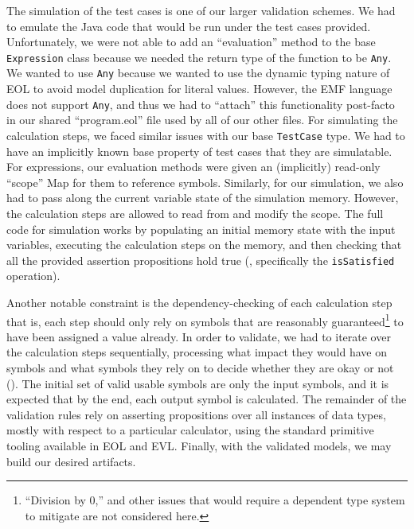 \documentclass[11pt,fleqn]{article}
\begin{document}
The simulation of the test cases is one of our larger validation schemes. We had
to emulate the Java code that would be run under the test cases provided.
Unfortunately, we were not able to add an ``evaluation'' method to the base
\lstinline{Expression} class because we needed the return type of the function
to be \lstinline{Any}. We wanted to use \lstinline{Any} because we wanted to use
the dynamic typing nature of EOL to avoid model duplication for literal values.
However, the EMF language does not support \lstinline{Any}, and thus we had to
``attach'' this functionality post-facto in our shared ``program.eol'' file used
by all of our other files. For simulating the calculation steps, we faced
similar issues with our base \lstinline{TestCase} type. We had to have an
implicitly known base property of test cases that they are simulatable. For
expressions, our evaluation methods were given an (implicitly) read-only
``scope'' Map for them to reference symbols. Similarly, for our simulation, we
also had to pass along the current variable state of the simulation memory.
However, the calculation steps are allowed to read from and modify the scope.
The full code for simulation works by populating an initial memory state with
the input variables, executing the calculation steps on the memory, and then
checking that all the provided assertion propositions hold true
(, specifically the \lstinline{isSatisfied}
operation).

Another notable constraint is the dependency-checking of each calculation step
\textemdash{} that is, each step should only rely on symbols that are reasonably
guaranteed\footnote{``Division by 0,'' and other issues that would require a
dependent type system to mitigate are not considered here.} to have been
assigned a value already. In order to validate, we had to iterate over the
calculation steps sequentially, processing what impact they would have on
symbols and what symbols they rely on to decide whether they are okay or not
(). The initial set of valid usable symbols
are only the input symbols, and it is expected that by the end, each output
symbol is calculated. The remainder of the validation rules rely on asserting
propositions over all instances of data types, mostly with respect to a
particular calculator, using the standard primitive tooling available in EOL and
EVL. Finally, with the validated models, we may build our desired artifacts.

\newpage{}
\end{document}
